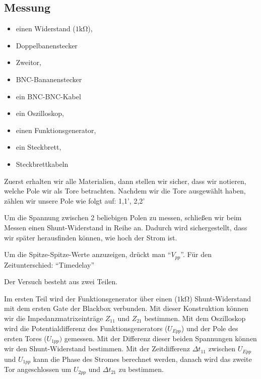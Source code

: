 %
\subsection{Messung}
\label{subsec:3_Messung}
%
%
\begin{itemize}
    \item einen Widerstand ($1\si{\kilo\ohm}$), 
    \item Doppelbanenstecker
    \item Zweitor,
    \item BNC-Bananenstecker
    \item ein BNC-BNC-Kabel 
    \item ein Oszilloskop, 
    \item einen Funktionsgenerator, 
    \item ein Steckbrett,
    \item Steckbrettkabeln
\end{itemize}

Zuerst erhalten wir alle Materialien, dann stellen wir sicher, dass wir notieren, welche Pole wir als Tore betrachten. Nachdem wir die Tore ausgewählt haben, zählen wir unsere Pole wie folgt auf: 1,1', 2,2'

Um die Spannung zwischen 2 beliebigen Polen zu messen, schließen wir beim Messen einen Shunt-Widerstand in Reihe an. Dadurch wird sichergestellt, dass wir später herausfinden können, wie hoch der Strom ist.

Um die Spitze-Spitze-Werte anzuzeigen, drückt man  \enquote{$V_{pp}$}. Für den Zeitunterschied: \enquote{Timedelay}

Der Versuch besteht aus zwei Teilen.
\par Im ersten Teil wird der Funktionsgenerator über einen  ($1\si{\kilo\ohm}$) Shunt-Widerstand mit dem ersten Gate der Blackbox verbunden. Mit dieser Konstruktion können wir die Impedanzmatrixeinträge $Z_{11}$ und $Z_{21}$ bestimmen. Mit dem Oszilloskop wird die Potentialdifferenz des Funktionsgenerators ($U_{Epp}$) und der Pole des ersten Tores ($U_{1pp})$ gemessen. Mit der Differenz dieser beiden Spannungen können wir den Shunt-Widerstand bestimmen. Mit der Zeitdifferenz $\Delta t_{11}$ zwischen $U_{Epp}$ und $U_{1pp}$ kann die Phase des Stromes berechnet werden, danach wird das zweite Tor angeschlossen um $U_{2pp}$ und $\Delta t_{21}$ zu bestimmen.

